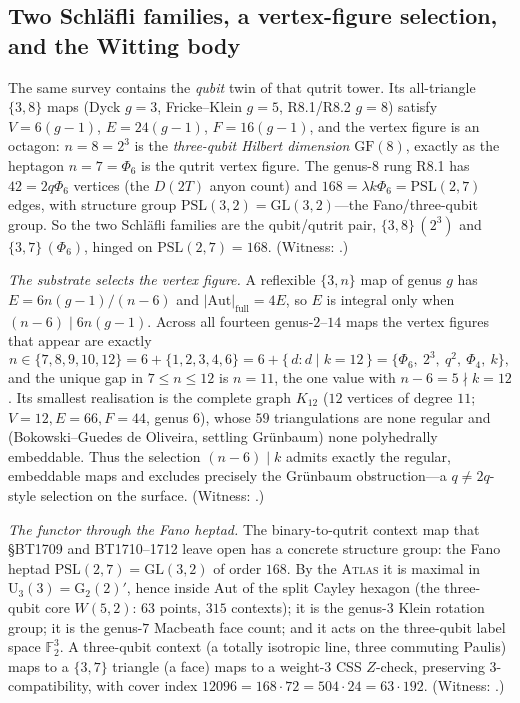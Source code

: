 \documentclass[11pt]{article}
\begin{document}
\subsection{Two Schl\"afli families, a vertex-figure selection, and the Witting body}

The same survey contains the \emph{qubit} twin of that qutrit tower. Its
all-triangle $\{3,8\}$ maps (Dyck $g{=}3$, Fricke--Klein $g{=}5$, R8.1/R8.2
$g{=}8$) satisfy $V=6(g-1)$, $E=24(g-1)$, $F=16(g-1)$, and the vertex figure is
an octagon: $n=8=2^3$ is the \emph{three-qubit Hilbert dimension} $\mathrm{GF}(8)$,
exactly as the heptagon $n=7=\Phi_6$ is the qutrit vertex figure. The genus-$8$
rung R8.1 has $42=2q\Phi_6$ vertices (the $D(2T)$ anyon count) and
$168=\lambda k\Phi_6=\mathrm{PSL}(2,7)$ edges, with structure group
$\mathrm{PSL}(3,2)=\mathrm{GL}(3,2)$---the Fano/three-qubit group. So the two
Schl\"afli families are the qubit/qutrit pair, $\{3,8\}\,(2^3)$ and
$\{3,7\}\,(\Phi_6)$, hinged on $\mathrm{PSL}(2,7)=168$. (Witness:
.)

\emph{The substrate selects the vertex figure.} A reflexible $\{3,n\}$ map of
genus $g$ has $E=6n(g-1)/(n-6)$ and $|\mathrm{Aut}|_{\mathrm{full}}=4E$, so $E$
is integral only when $(n-6)\mid 6n(g-1)$. Across all fourteen genus-$2$--$14$
maps the vertex figures that appear are exactly
\[
  n\in\{7,8,9,10,12\}=6+\{1,2,3,4,6\}=6+\{\,d:d\mid k=12\,\}
   =\{\Phi_6,\ 2^3,\ q^2,\ \Phi_4,\ k\},
\]
and the unique gap in $7\le n\le 12$ is $n=11$, the one value with
$n-6=5\nmid k=12$. Its smallest realisation is the complete graph $K_{12}$
($12$ vertices of degree $11$; $V{=}12,E{=}66,F{=}44$, genus $6$), whose
$59$ triangulations are none regular and (Bokowski--Guedes de Oliveira, settling
Gr\"unbaum) none polyhedrally embeddable. Thus the selection $(n-6)\mid k$ admits
exactly the regular, embeddable maps and excludes precisely the Gr\"unbaum
obstruction---a $q\neq 2q$-style selection on the surface. (Witness:
.)

\emph{The functor through the Fano heptad.} The binary-to-qutrit context map that
\S BT1709 and BT1710--1712 leave open has a concrete structure group: the Fano
heptad $\mathrm{PSL}(2,7)=\mathrm{GL}(3,2)$ of order $168$. By the \textsc{Atlas}
it is maximal in $\mathrm{U}_3(3)=\mathrm G_2(2)'$, hence inside
$\mathrm{Aut}$ of the split Cayley hexagon (the three-qubit core $W(5,2)$:
$63$ points, $315$ contexts); it is the genus-$3$ Klein rotation group; it is the
genus-$7$ Macbeath face count; and it acts on the three-qubit label space
$\mathbb F_2^3$. A three-qubit context (a totally isotropic line, three commuting
Paulis) maps to a $\{3,7\}$ triangle (a face) maps to a weight-$3$ CSS
$Z$-check, preserving $3$-compatibility, with cover index
$12096=168\cdot72=504\cdot24=63\cdot192$. (Witness:
.)
\end{document}
